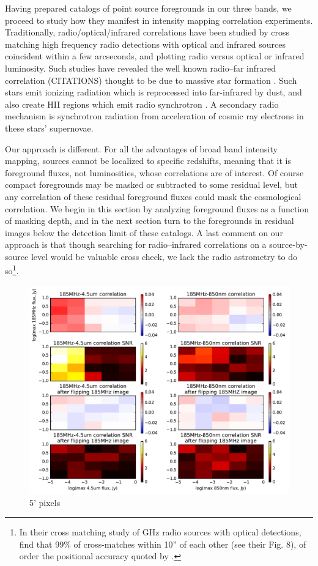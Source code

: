 \documentclass[preprint]{aastex}
\begin{document}
Having prepared catalogs of point source foregrounds in our three bands, we proceed to study how they manifest in intensity mapping correlation experiments. Traditionally, radio/optical/infrared correlations have been studied by cross matching high frequency radio detections with optical and infrared sources coincident within a few arcseconds, and plotting radio versus optical or infrared luminosity. Such studies have revealed the well known radio--far infrared correlation (CITATIONS) thought to be due to massive star formation \citep[e.g.][]{helou85,dejong85,yun01,xu94}. Such stars emit ionizing radiation which is reprocessed into far-infrared by dust, and also create HII regions which emit radio synchrotron \citep{xu94}. A secondary radio mechanism is synchrotron radiation from acceleration of cosmic ray electrons in these stars' supernovae. 

Our approach is different. For all the advantages of broad band intensity mapping, sources cannot be localized to specific redshifts, meaning that it is foreground fluxes, not luminosities, whose correlations are of interest. Of course compact foregrounds may be masked or subtracted to some residual level, but any correlation of these residual foreground fluxes could mask the cosmological correlation. We begin in this section by analyzing foreground fluxes as a function of masking depth, and in the next section turn to the foregrounds in residual images below the detection limit of these catalogs. A last comment on our approach is that though searching for radio--infrared correlations on a source-by-source level would be valuable cross check, we lack the radio astrometry to do so\footnote{In their cross matching study of GHz radio sources with optical detections, \citep{mcmahon02} find that 99\% of cross-matches within 10'' of each other (see their Fig. 8), of order the positional accuracy quoted by \citet{PattiCatalog1}.}. 

\begin{figure}[h]
\centering
\includegraphics[width=5.5in]{images/source_correlation_grids_and_snrs.pdf}
\caption{5' pixels}
\label{fig:correlationsandSNRs}
\end{figure}
\end{document}

